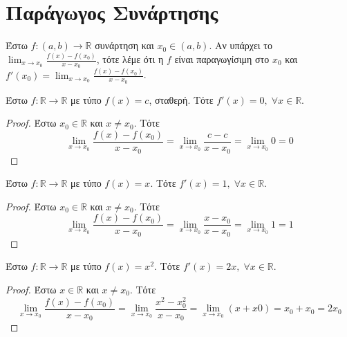 \section{Παράγωγος Συνάρτησης}

\begin{dfn}
  Έστω $ f \colon (a,b) \to \mathbb{R} $ συνάρτηση και $ x_{0} \in (a,b) $. Αν 
  υπάρχει το $ \lim_{x \to x_{0}} \frac{f(x) - f(x_{0})}{x - x_{0}}$, τότε λέμε ότι 
  η $f$ είναι παραγωγίσιμη στο $ x_{0} $ και $ f'(x_{0}) = \lim_{x \to x_{0}} 
  \frac{f(x)-f(x_{0})}{x- x_{0}} $.
\end{dfn}

\begin{prop}
  Έστω $ f \colon \mathbb{R} \to \mathbb{R} $ με τύπο $ f(x)=c $, σταθερή. Τότε 
  $ f'(x) = 0, \; \forall x \in \mathbb{R} $. 
\end{prop}

\begin{proof}
  Έστω $ x_{0} \in \mathbb{R} $ και $ x \neq x_{0} $. Τότε
  \[
    \lim_{x \to x_{0}}  \frac{f(x) - f(x_{0})}{x - x_{0}} = \lim_{x \to x_{0}} 
    \frac{c - c}{x - x_{0}} = \lim_{x \to x_{0}} 0 = 0
  \] 

\end{proof}

\begin{prop}
  Έστω $ f \colon \mathbb{R} \to \mathbb{R} $ με τύπο $ f(x)=x $. Τότε 
  $ f'(x) = 1, \; \forall x \in \mathbb{R} $. 
\end{prop}

\begin{proof}
  Έστω $ x_{0} \in \mathbb{R} $ και $ x \neq x_{0} $. Τότε
  \[
    \lim_{x \to x_{0}} \frac{f(x) - f(x_{0})}{x - x_{0}} = \lim_{x \to x_{0}} 
    \frac{x - x_{0}}{x - x_{0}} = \lim_{x \to x_{0}} 1 = 1
  \] 

\end{proof}

\begin{prop}
  Έστω $ f \colon \mathbb{R} \to \mathbb{R} $ με τύπο $ f(x)=x^{2} $. Τότε 
  $ f'(x) = 2x, \; \forall x \in \mathbb{R} $. 
\end{prop}

\begin{proof}
  Έστω $ x \in \mathbb{R} $ και $ x \neq x_{0} $. Τότε 
  \[
    \lim_{x \to x_{0}} \frac{f(x) - f(x_{0})}{x- x_{0}} = \lim_{x \to x_{0}} 
    \frac{x^{2} - x_{0}^{2}}{x - x_{0}} = \lim_{x \to x_{0}} (x+x0) = x_{0}+ x_{0}
    = 2 x_{0}
  \] 
\end{proof}

